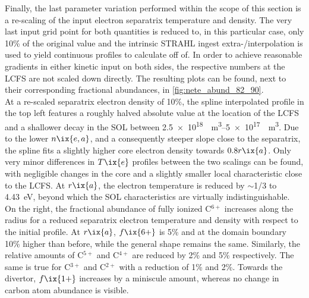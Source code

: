 %
                Finally, the last parameter variation performed within the scope of this section is a re-scaling of the input electron separatrix temperature and density. The very last input grid point for both quantities is reduced to, in this particular case, only 10\% of the original value and the intrinsic STRAHL ingest extra-/interpolation is used to yield continuous profiles to calculate off of. In order to achieve reasonable gradients in either kinetic input on both sides, the respective numbers at the LCFS are not scaled down directly. The resulting plots can be found, next to their corresponding fractional abundances, in \cref{fig:nete_abund_82_90}.\\%
                At a re-scaled separatrix electron density of 10\%, the spline interpolated profile in the top left features a roughly halved absolute value at the location of the LCFS and a shallower decay in the SOL between \SIrange{2.5e18}{5e17}{\per\cubic\meter}. Due to the lower $n\ix{e,a}$, and a consequently steeper slope close to the separatrix, the spline fits a slightly higher core electron density towards $0.8r\ix{a}$. Only very minor differences in $T\ix{e}$ profiles between the two scalings can be found, with negligible changes in the core and a slightly smaller local characteristic close to the LCFS. At $r\ix{a}$, the electron temperature is reduced by $\sim$1/3 to \SI{4.43}{\electronvolt}, beyond which the SOL characteristics are virtually indistinguishable.\\%
                On the right, the fractional abundance of fully ionized C$^{6+}$ increases along the radius for a reduced separatrix electron temperature and density with respect to the initial profile. At $r\ix{a}$, $f\ix{6+}$ is 5\% and at the domain boundary 10\% higher than before, while the general shape remains the same. Similarly, the relative amounts of C$^{5+}$ and C$^{4+}$ are reduced by 2\% and 5\% respectively. The same is true for C$^{3+}$ and C$^{2+}$ with a reduction of 1\% and 2\%. Towards the divertor, $f\ix{1+}$ increases by a miniscule amount, whereas no change in carbon atom abundance is visible.\\%
%
